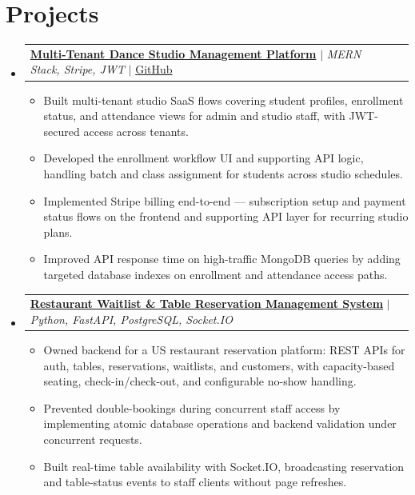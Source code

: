 \documentclass[letterpaper,11pt]{article}
\makeatletter
\newcommand{\resumeItem}[1]{
  \item\small{#1 \vspace{-2pt}}
}
\newcommand{\resumeProjectHeading}[2]{
    \item
    \begin{tabular*}{0.97\textwidth}{l@{\extracolsep{\fill}}r}
      \small#1 & #2 \\
    \end{tabular*}\vspace{-7pt}
}
\newcommand{\resumeSubHeadingListStart}{\begin{itemize}[leftmargin=0.15in, label={}]}
\newcommand{\resumeSubHeadingListEnd}{\end{itemize}}
\newcommand{\resumeItemListStart}{
  \begin{itemize}[
    leftmargin=0.18in,
    label={\tiny$\bullet$},
    itemsep=-1pt,
    topsep=0pt,
    parsep=0pt,
    partopsep=0pt
  ]
}
\newcommand{\resumeItemListEnd}{\end{itemize}\vspace{-6pt}}
\makeatother
\begin{document}
\section{Projects}
    \resumeSubHeadingListStart

      \resumeProjectHeading
          {\textbf{\href{https://anuragportfolio15.netlify.app/}{Multi-Tenant Dance Studio Management Platform}} $|$ \emph{MERN Stack, Stripe, JWT} $|$ \href{https://github.com/AnuragTak16}{GitHub}}{}
          \resumeItemListStart
            \resumeItem{Built multi-tenant studio SaaS flows covering student profiles, enrollment status, and attendance views for admin and studio staff, with JWT-secured access across tenants.}
            \resumeItem{Developed the enrollment workflow UI and supporting API logic, handling batch and class assignment for students across studio schedules.}
            \resumeItem{Implemented Stripe billing end-to-end --- subscription setup and payment status flows on the frontend and supporting API layer for recurring studio plans.}
            \resumeItem{Improved API response time on high-traffic MongoDB queries by adding targeted database indexes on enrollment and attendance access paths.}
          \resumeItemListEnd

        \resumeProjectHeading
          {\textbf{\href{https://anuragportfolio15.netlify.app/}{Restaurant Waitlist \& Table Reservation Management System}} $|$ \emph{Python, FastAPI, PostgreSQL, Socket.IO}}{}
          \resumeItemListStart
            \resumeItem{Owned backend for a US restaurant reservation platform: REST APIs for auth, tables, reservations, waitlists, and customers, with capacity-based seating, check-in/check-out, and configurable no-show handling.}
            \resumeItem{Prevented double-bookings during concurrent staff access by implementing atomic database operations and backend validation under concurrent requests.}
            \resumeItem{Built real-time table availability with Socket.IO, broadcasting reservation and table-status events to staff clients without page refreshes.}
          \resumeItemListEnd

    \resumeSubHeadingListEnd

\end{document}
